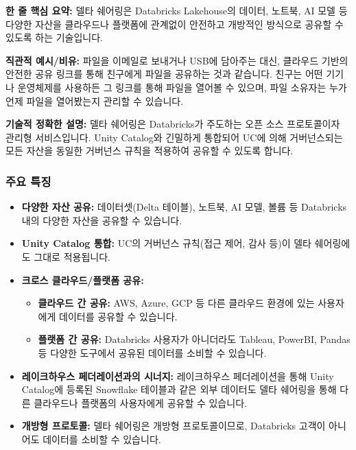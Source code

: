 \documentclass[11pt,a4paper]{article}
\begin{document}
\begin{keyconceptbox}
\textbf{한 줄 핵심 요약:} 델타 쉐어링은 Databricks Lakehouse의 데이터, 노트북, AI 모델 등 다양한 자산을 클라우드나 플랫폼에 관계없이 안전하고 개방적인 방식으로 공유할 수 있도록 하는 기술입니다.
\end{keyconceptbox}

\textbf{직관적 예시/비유:}
파일을 이메일로 보내거나 USB에 담아주는 대신, 클라우드 기반의 안전한 공유 링크를 통해 친구에게 파일을 공유하는 것과 같습니다. 친구는 어떤 기기나 운영체제를 사용하든 그 링크를 통해 파일을 열어볼 수 있으며, 파일 소유자는 누가 언제 파일을 열어봤는지 관리할 수 있습니다.

\textbf{기술적 정확한 설명:}
델타 쉐어링은 Databricks가 주도하는 오픈 소스 프로토콜이자 관리형 서비스입니다. Unity Catalog와 긴밀하게 통합되어 UC에 의해 거버넌스되는 모든 자산을 동일한 거버넌스 규칙을 적용하여 공유할 수 있도록 합니다.

\subsubsection*{주요 특징}
\begin{itemize}
    \item \textbf{다양한 자산 공유:} 데이터셋(Delta 테이블), 노트북, AI 모델, 볼륨 등 Databricks 내의 다양한 자산을 공유할 수 있습니다.
    \item \textbf{Unity Catalog 통합:} UC의 거버넌스 규칙(접근 제어, 감사 등)이 델타 쉐어링에도 그대로 적용됩니다.
    \item \textbf{크로스 클라우드/플랫폼 공유:}
    \begin{itemize}
        \item \textbf{클라우드 간 공유:} AWS, Azure, GCP 등 다른 클라우드 환경에 있는 사용자에게 데이터를 공유할 수 있습니다.
        \item \textbf{플랫폼 간 공유:} Databricks 사용자가 아니더라도 Tableau, PowerBI, Pandas 등 다양한 도구에서 공유된 데이터를 소비할 수 있습니다.
    \end{itemize}
    \item \textbf{레이크하우스 페더레이션과의 시너지:} 레이크하우스 페더레이션을 통해 Unity Catalog에 등록된 Snowflake 테이블과 같은 외부 데이터도 델타 쉐어링을 통해 다른 클라우드나 플랫폼의 사용자에게 공유할 수 있습니다.
    \item \textbf{개방형 프로토콜:} 델타 쉐어링은 개방형 프로토콜이므로, Databricks 고객이 아니어도 데이터를 소비할 수 있습니다.
\end{itemize}
\end{document}
